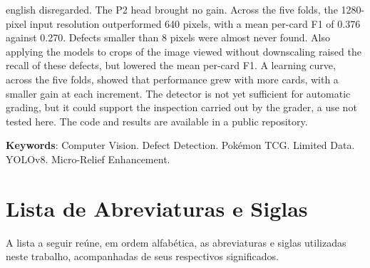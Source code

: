 \documentclass[
    12pt,                %
    openright,           %
    oneside,             %
    a4paper,             %
    english,             %
    brazil               %
]{abntex2}
\begin{document}
\begin{resumo}[Abstract]
\begin{otherlanguage*}{english}
      disregarded. The P2 head brought no gain. Across the five
      folds, the 1280-pixel input resolution outperformed 640 pixels, with a
      mean per-card F1 of 0.376 against 0.270. Defects smaller than 8
      pixels were almost never found. Also applying the models to crops
      of the image viewed without downscaling raised the recall of these defects, but
      lowered the mean per-card F1. A learning curve, across the five
      folds, showed that performance grew with more cards, with a smaller
      gain at each increment. The detector is not
      yet sufficient for automatic grading, but it could support the
      inspection carried out by the grader, a use not tested here. The code and results are available in a public
      repository.

   \vspace{\onelineskip}

   \noindent
   \textbf{Keywords}: Computer Vision. Defect Detection. Pokémon TCG.
   Limited Data. YOLOv8. Micro-Relief Enhancement.
 \end{otherlanguage*}
\end{resumo}

\listoffigures*
\cleardoublepage

\listoftables*
\cleardoublepage

\chapter*{Lista de Abreviaturas e Siglas}

\noindent A lista a seguir reúne, em ordem alfabética, as abreviaturas e siglas utilizadas neste trabalho, acompanhadas de seus respectivos significados.

\vspace{\onelineskip}
\end{document}

